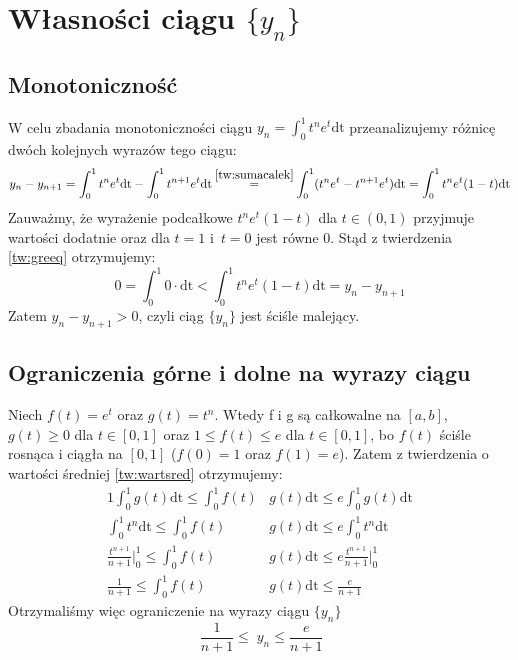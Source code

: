 \documentclass[11pt,wide]{article}
\newcommand\numeq[1]%
  {\stackrel{\scriptscriptstyle \mkern-1.5mu#1\mkern-1.5mu }{=}}
\begin{document}
\section{Własności ciągu \(\{y_n\}\)}
\subsection{Monotoniczność} \label{wl:malejacy}
W celu zbadania monotoniczności ciągu \(\displaystyle y_n = \int_0^1 t^n e^t \mathrm{dt}\) przeanalizujemy różnicę dwóch kolejnych wyrazów tego ciągu:
\begin{equation}
y_n - y_{n+1} = \int_0^1 t^n e^t \mathrm{dt} - \int_0^1 t^{n+1} e^t \mathrm{dt} \numeq{\eqref{tw:sumacalek}} 
\int_0^1 (t^n e^t - t^{n+1} e^t) \mathrm{dt} = \int_0^1 t^n e^t(1 - t)\mathrm{dt}
\end{equation}
Zauważmy, że wyrażenie podcałkowe \(t^n e^t(1 - t)\) dla \( t \in (0, 1) \) przyjmuje wartości dodatnie oraz dla 
\(t=1\) i~\(t=0\) jest równe 0.  Stąd z twierdzenia \eqref{tw:greeq} otrzymujemy: 
\begin{equation}
0 = \int_0^1 0 \cdot  \mathrm{dt} < \int_0^1 t^n e^t(1 - t)\mathrm{dt}
= y_n - y_{n+1}
\end{equation} 
Zatem \(y_n - y_{n+1} > 0 \), czyli ciąg \(\{y_n\}\) jest ściśle malejący.

\subsection{Ograniczenia górne i dolne na wyrazy ciągu} \label{wl:ograniczenia}
Niech \(f(t) = e^t\) oraz \(g(t) = t^n\). Wtedy f i g są całkowalne na \([a,b]\), \(g(t) \geq ­0\) dla \(t \in [0,1]\) oraz \(1 \leq f(t) \leq e\) dla \(t \in [0,1]\), bo \(f(t)\) ściśle rosnąca i ciągła na \([0,1]\) (\(f(0) = 1\) oraz \(f(1) = e\)). Zatem z twierdzenia o wartości średniej \eqref{tw:wartsred} otrzymujemy:
\begin{align} 
1\int_0^1 g(t) \mathrm{dt} \leq \int_0^1 f(t) & g(t) \mathrm{dt} \leq e \int_0^1 g(t) \mathrm{dt} \\
\int_0^1 t^n \mathrm{dt} \leq \int_0^1 f(t) & g(t) \mathrm{dt} \leq e \int_0^1 t^n \mathrm{dt} \\
\frac{t^{n+1}}{n+1}\Big|_{0}^{1} \leq \int_0^1 f(t) & g(t) \mathrm{dt} \leq e \frac{t^{n+1}}{n+1}\Big|_{0}^{1} \\
\frac{1}{n+1} \leq \int_0^1 f(t) & g(t) \mathrm{dt} \leq \frac{e}{n+1} 
\end{align}
Otrzymaliśmy więc ograniczenie na wyrazy ciągu \(\{y_n\}\)
\begin{equation}\
\frac{1}{n+1} \leq \; y_n \leq \frac{e}{n+1}
\end{equation}
\end{document}
